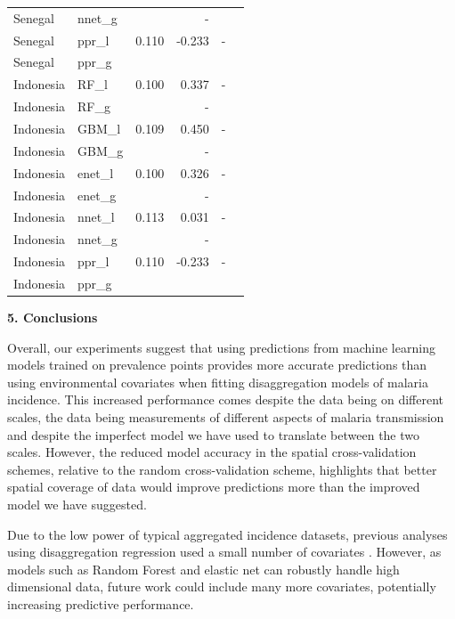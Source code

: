 \documentclass[11pt]{article}
\begin{document}
\begin{table}
\begin{tabular}{ll|rrrr}
Senegal & nnet_g &  & - &&\\
Senegal & ppr_l & 0.110 & -0.233 &-&\\
Senegal & ppr_g &  &  &&\vspace{0.3cm}\\ 
Indonesia & RF_l & 0.100 & 0.337 &-&\\
Indonesia & RF_g &  & - &&\\
Indonesia & GBM_l & 0.109 & 0.450 & - &\\
Indonesia & GBM_g &  & - &&\\
Indonesia & enet_l & 0.100 & 0.326 &-&\\
Indonesia & enet_g &  & - &&\\
Indonesia & nnet_l & 0.113 & 0.031 &-&\\
Indonesia & nnet_g &  & - &&\\
Indonesia & ppr_l & 0.110 & -0.233 &-&\\
Indonesia & ppr_g &  &  &&\\
\end{tabular}
\label{t:mlresults}
\end{table}


{\bf 5. Conclusions}

Overall, our experiments suggest that using predictions from machine learning models trained on prevalence points provides more accurate predictions than using environmental covariates when fitting disaggregation models of malaria incidence.
This increased performance comes despite the data being on different scales, the data being measurements of different aspects of malaria transmission and despite the imperfect model we have used to translate between the two scales.
However, the reduced model accuracy in the spatial cross-validation schemes, relative to the random cross-validation scheme, highlights that better spatial coverage of data would improve predictions more than the improved model we have suggested.

Due to the low power of typical aggregated incidence datasets, previous analyses using disaggregation regression used a small number of covariates \citep{sturrock2014fine}.
However, as models such as Random Forest and elastic net can robustly handle high dimensional data, future work could include many more covariates, potentially increasing predictive performance.


\end{document}
